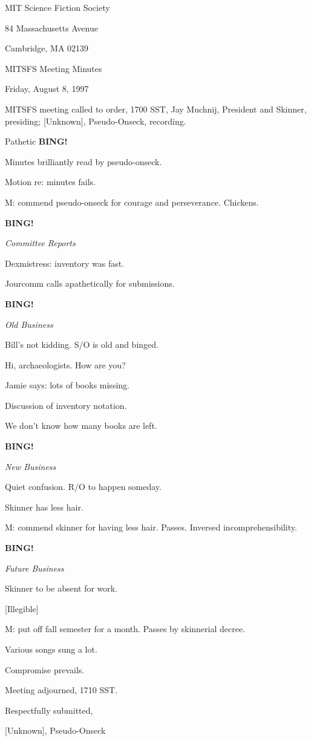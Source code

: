 \documentclass[12pt]{article}
\newcommand{\bing}{{\bf BING!} }
\newcommand{\goto}[1]{\bing \vskip 12pt \centerline{{\em{#1}}}}
\begin{document}
\begin{center}

MIT Science Fiction Society 

84 Massachusetts Avenue

Cambridge, MA 02139

\vspace{12pt}

MITSFS Meeting Minutes 

Friday, August 8, 1997

\end{center}
 
\vspace{18pt}

\setlength{\parskip}{6pt}

\noindent
MITSFS meeting called to order, 1700 SST,
Jay Muchnij, President and Skinner, presiding; [Unknown], Pseudo-Onseck, recording.

Pathetic \bing

Minutes brilliantly read by pseudo-onseck.

Motion re: minutes fails.

M: commend pseudo-onseck for courage and perseverance. Chickens.

\goto{Committee Reports}

Dexmistress: inventory was fast.

Jourcomm calls apathetically for submissions.

\goto{Old Business}

Bill's not kidding. S/O is old and binged.

Hi, archaeologists. How are you?

Jamie says: lots of books missing.

Discussion of inventory notation.

We don't know how many books are left.

\goto{New Business}

Quiet confusion. R/O to happen someday.

Skinner has less hair.

M: commend skinner for having less hair. Passes. Inversed incomprehensibility.

\goto{Future Business}

Skinner to be absent for work.

[Illegible]

M: put off fall semester for a month. Passes by skinnerial decree.

Various songs sung a lot.

Compromise prevails.

\vspace{12pt}

\noindent
Meeting adjourned, 1710 SST.

\vspace{18pt}

\centerline{Respectfully submitted,}
\centerline{[Unknown], Pseudo-Onseck}
\end{document}
